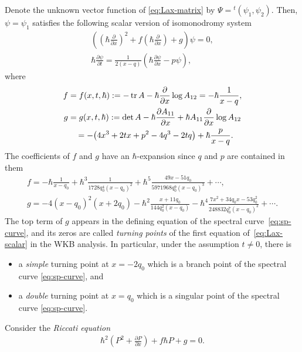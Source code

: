 \documentclass[11pt]{article}
\theoremstyle{definition}
\numberwithin{equation}{section}
\def\p{\partial}
\begin{document}
Denote the unknown vector function of \eqref{eq:Lax-matrix}
by $\Psi = {}^t(\psi_1, \psi_2)$.
Then, $\psi = \psi_1$ satisf\/ies the
following scalar version of isomonodromy system
\begin{gather}
\left( \left(\hbar\frac{\p}{\p x}\right)^{2} +
f \left(\hbar\frac{\p}{\p x}\right) + g \right)\psi = 0, \nonumber\\
\hbar \frac{\p \psi}{\p t} = \frac{1}{2(x-q)} \left(
\hbar \frac{\p \psi}{\p x} - p \psi \right),\label{eq:Lax-scalar}
\end{gather}
where
\begin{gather*}
f = f(x,t,\hbar)   :=   -\operatorname{tr} A - \hbar \frac{\p}{\p x}\log A_{12}
= -\hbar \frac{1}{x-q},  \\
g = g(x,t,\hbar)   :=   \det A - \hbar \frac{\p A_{11}}{\p x} +
\hbar A_{11} \frac{\p}{\p x}\log A_{12}   \\
\hphantom{g}{}
  =
- \big(4x^{3} + 2tx + p^{2} - 4q^{3} - 2tq\big) + \hbar \frac{p}{x-q}.
\end{gather*}
The coef\/f\/icients of $f$ and $g$ have an $\hbar$-expansion since
$q$ and $p$ are contained in them
\begin{gather} \label{eq:hbar-correction-in-quantization}
f   =   - \hbar  \frac{1}{x-q_{0}}
 +\hbar^{3} \frac{1}{1728q_{0}^{4}(x-q_{0})^{2}} + \hbar^{5}
 \frac{49x-51q_{0}}{5971968q_{0}^{9}(x-q_{0})^{3}} + \cdots,
\\  \label{eq:hbar-correction-in-quantization2}
g   =   -4(x-q_{0})^{2}(x+2q_{0})
 - \hbar^{2} \frac{x+11q_{0}}{144q_{0}^{2}(x-q_{0})}
 - \hbar^{4} \frac{7x^{2}+34q_{0}x-53q_{0}^{2}}
  {248832q_{0}^{7}(x-q_{0})^{2}}+\cdots .
\end{gather}
The top term of $g$ appears in the def\/ining equation of
the spectral cur\-ve~\eqref{eq:sp-curve},
and its zeros are called {\em turning points}
of the f\/irst equation of~\eqref{eq:Lax-scalar}
in the WKB analysis.
In particular, under the assumption $t \ne 0$, there is
\begin{itemize}\itemsep=0pt
\item
a {\em simple} turning point at $x=-2q_{0}$
which is a branch point
of the spectral curve \eqref{eq:sp-curve}, and
\item
a {\em double} turning point at $x = q_{0}$
which is a singular point of
the spectral curve \eqref{eq:sp-curve}.
\end{itemize}
Consider the {\em Riccati equation}
\begin{gather} \label{eq:Riccati}
\hbar^{2} \left( P^{2} + \frac{\p P}{\p x} \right)
+ f \hbar P + g = 0.
\end{gather}
\end{document}

